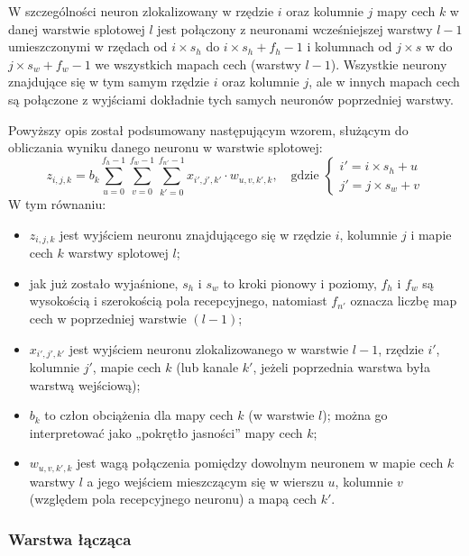 \documentclass[12pt]{mwbk}
\theoremstyle{plain}
\theoremstyle{definition}
\theoremstyle{remark}
\begin{document}
W szczególności neuron zlokalizowany w rzędzie $i$ oraz kolumnie $j$ mapy cech $k$ w danej warstwie
splotowej $l$ jest połączony z neuronami wcześniejszej warstwy $l-1$ umieszczonymi w rzędach od $i\times s_h$
do $i\times s_h +f_h -1$ i kolumnach od $j\times s$ w do $j\times s_w +f_w -1$ we wszystkich mapach cech (warstwy $l-1$). Wszystkie neurony znajdujące się w tym samym rzędzie $i$ oraz kolumnie $j$, ale w innych
mapach cech są połączone z wyjściami dokładnie tych samych neuronów poprzedniej warstwy.



Powyższy opis został podsumowany następującym wzorem, służącym do obliczania wyniku danego neuronu w warstwie splotowej:
$$z_{i,j,k}=b_k\sum_{u=0}^{f_h-1}\sum_{v=0}^{f_w-1}\sum_{k'=0}^{f_{n'}-1}x_{i', j', k'} \cdot w_{u,v,k', k},\text{~~~gdzie }\begin{cases}
i'=i \times s_h+u\\
j'=j \times s_w+v
\end{cases}$$
W tym równaniu:
\begin{itemize}
	\item $z_{i,j,k}$ jest wyjściem neuronu znajdującego się w rzędzie $i$, kolumnie $j$ i mapie cech $k$ warstwy
	splotowej $l$;
	\item jak już zostało wyjaśnione, $s_h$ i $s_w$ to kroki pionowy i poziomy, $f_h$ i $f_w$ są wysokością i szerokością
	pola recepcyjnego, natomiast $f_{n'}$ oznacza liczbę map cech w poprzedniej warstwie $(l-1)$;
	\item $x_{i',j',k'}$ jest wyjściem neuronu zlokalizowanego w warstwie $l-1$, rzędzie $i'$, kolumnie $j'$, mapie
	cech $k$ (lub kanale $k'$, jeżeli poprzednia warstwa była warstwą wejściową);
	\item $b_k$ to człon obciążenia dla mapy cech $k$ (w warstwie $l$); można go interpretować jako „pokrętło
	jasności” mapy cech $k$;
	\item $w_{u,v,k',k}$ jest wagą połączenia pomiędzy dowolnym neuronem w mapie cech $k$ warstwy $l$ a jego
	wejściem mieszczącym się w wierszu $u$, kolumnie $v$ (względem pola recepcyjnego neuronu)
	a mapą cech $k'$.
\end{itemize}



\subsubsection{Warstwa łącząca}
\end{document}
